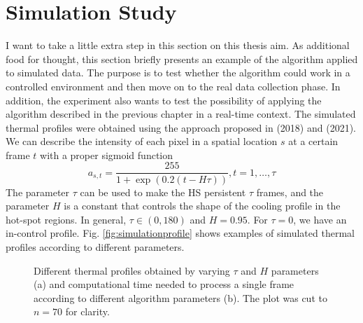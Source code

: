 

\section{Simulation Study}
\label{sec:simstudy}
I want to take a little extra step in this section on this thesis aim. As additional food for thought, this section briefly presents an example of the algorithm applied to simulated data. The purpose is to test whether the algorithm could work in a controlled environment and then move on to the real data collection phase. In addition, the experiment also wants to test the possibility of applying the algorithm described in the previous chapter in a real-time context. The simulated thermal profiles were obtained using the approach proposed in \cite{colosimo_spatially_2018} (2018) and \citeauthor{yan_real-time_2021} (2021). We can describe the intensity of each pixel in a spatial location $s$ at a certain frame $t$ with a proper sigmoid function
\begin{equation}
    \label{eq:simulation}
    a_{s, t}=\frac{255}{1+\exp (0.2(t-H \tau))}, t=1, \ldots, \tau
\end{equation}
The parameter $\tau$ can be used to make the HS persistent $\tau$ frames, and the parameter $H$ is a constant that controls the shape of the cooling profile in the hot-spot regions. In general, $\tau \in \left(0,180\right)$ and $H=0.95$. For $\tau=0$, we have an in-control profile. Fig. \ref{fig:simulationprofile} shows examples of simulated thermal profiles according to different parameters.
\begin{figure}
    \centering
    \quad

   \caption[Simulated profiles and computational time.]{Different thermal profiles obtained by varying $\tau$ and $H$ parameters (a) and computational time needed to process a single frame according to different algorithm parameters (b). The plot was cut to $n=70$ for clarity.}
    
\end{figure}
